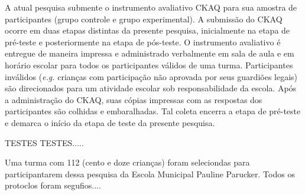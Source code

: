 A atual pesquisa submente o instrumento avaliativo \ac{CKAQ} para sua amostra de participantes (grupo controle e grupo experimental). A submissão do \ac{CKAQ} ocorre em duas etapas distintas da presente pesquisa, inicialmente na etapa de pré-teste e posteriormente na etapa de pós-teste. O instrumento avaliativo é entregue de maneira impressa e administrado verbalmente em sala de aula e em horário escolar para todos os participantes válidos de uma turma. Participantes inválidos (\textit{e.g.} crianças com participação não aprovada por seus guardiões legais) são direcionados para um atividade escolar sob responsabilidade da escola. Após a administração do \ac{CKAQ}, suas cópias impressas com as respostas dos participantes são colhidas e embaralhadas. Tal coleta encerra a etapa de pré-teste e demarca o início da etapa de teste da presente pesquisa.




TESTES TESTES.....

Uma turma com 112 (cento e doze crianças) foram seleciondas para participantarem dessa pesquisa da Escola Municipal Pauline Parucker. Todos os protoclos foram segufios....









